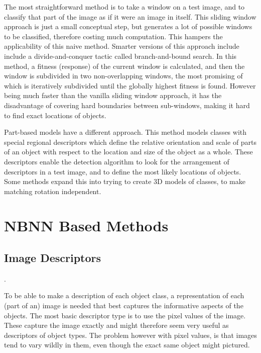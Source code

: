 The most straightforward method is to take a window on a test image, and to classify that part of the image as if it were an image in itself. This sliding window approach  is just a small conceptual step, but generates a lot of possible windows to be classified, therefore costing much computation. This hampers the applicability of this naive method. Smarter versions of this approach include include a divide-and-conquer tactic called branch-and-bound search. \cite{lampert2008beyond} In this method, a fitness (response) of the current window is calculated, and then the window is subdivided in two non-overlapping windows, the most promising of which is iteratively subdivided until the globally highest fitness is found. However being much faster than the vanilla sliding window approach, it has the disadvantage of covering hard boundaries between sub-windows, making it hard to find exact locations of objects.

Part-based models have a different approach. This method models classes with special regional descriptors which define the relative orientation and scale of parts of an object with respect to the location and size of the object as a whole. \cite{leibe2004combined, chum2007exemplar, felzenszwalb2010object} These descriptors enable the detection algorithm to look for the arrangement of descriptors in a test image, and to define the most likely locations of objects. Some methods expand this into trying to create 3D models of classes, to make matching rotation independent. 


\section{NBNN Based Methods} %
\label{sec:nbnn_based_methods}

\subsection{Image Descriptors} %
\label{sub:image_descriptors}

.

To be able to make a description of each object class, a representation of each (part of an) image is needed that best captures the informative aspects of the objects. The most basic descriptor type is to use the pixel values of the image. These capture the image exactly and might therefore seem very useful as descriptors of object types. The problem however with pixel values, is that images tend to vary wildly in them, even though the exact same object might pictured.

